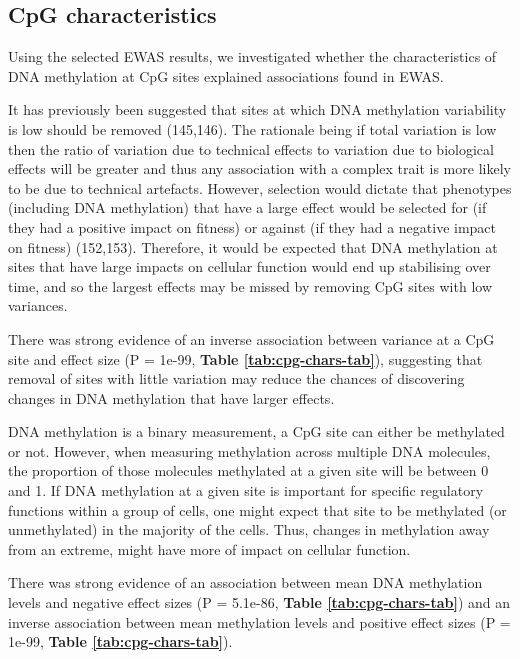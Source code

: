 \documentclass[11pt,oneside]{bristolthesis}
\begin{document}
\hypertarget{cpg-characteristics}{%
\subsection{CpG characteristics}\label{cpg-characteristics}}

Using the selected EWAS results, we investigated whether the characteristics of DNA methylation at CpG sites explained associations found in EWAS.

It has previously been suggested that sites at which DNA methylation variability is low should be removed (145,146). The rationale being if total variation is low then the ratio of variation due to technical effects to variation due to biological effects will be greater and thus any association with a complex trait is more likely to be due to technical artefacts. However, selection would dictate that phenotypes (including DNA methylation) that have a large effect would be selected for (if they had a positive impact on fitness) or against (if they had a negative impact on fitness) (152,153). Therefore, it would be expected that DNA methylation at sites that have large impacts on cellular function would end up stabilising over time, and so the largest effects may be missed by removing CpG sites with low variances.

There was strong evidence of an inverse association between variance at a CpG site and effect size (P = 1e-99, \textbf{Table \ref{tab:cpg-chars-tab}}), suggesting that removal of sites with little variation may reduce the chances of discovering changes in DNA methylation that have larger effects.

DNA methylation is a binary measurement, a CpG site can either be methylated or not. However, when measuring methylation across multiple DNA molecules, the proportion of those molecules methylated at a given site will be between 0 and 1. If DNA methylation at a given site is important for specific regulatory functions within a group of cells, one might expect that site to be methylated (or unmethylated) in the majority of the cells. Thus, changes in methylation away from an extreme, might have more of impact on cellular function.

There was strong evidence of an association between mean DNA methylation levels and negative effect sizes (P = 5.1e-86, \textbf{Table \ref{tab:cpg-chars-tab}}) and an inverse association between mean methylation levels and positive effect sizes (P = 1e-99, \textbf{Table \ref{tab:cpg-chars-tab}}).
\end{document}
